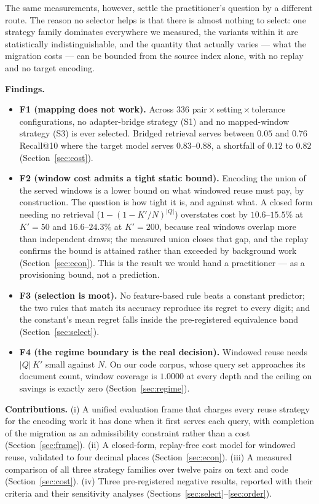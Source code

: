 \documentclass[conference]{IEEEtran}
\begin{document}
The same measurements, however, settle the practitioner's question by a different
route. The reason no selector helps is that there is almost nothing to select: one
strategy family dominates everywhere we measured, the variants within it are
statistically indistinguishable, and the quantity that actually varies --- what the
migration costs --- can be bounded from the source index alone, with no replay and no target
encoding.

\textbf{Findings.}
\begin{itemize}
\item \textbf{F1 (mapping does not work).} Across 336
pair\,$\times$\,setting\,$\times$\,tolerance configurations, no adapter-bridge strategy
(S1) and no mapped-window strategy (S3) is ever selected. Bridged retrieval serves
between $0.05$ and $0.76$ Recall@10 where the target model serves $0.83$--$0.88$, a
shortfall of $0.12$ to $0.82$ (Section~\ref{sec:cost}).
\item \textbf{F2 (window cost admits a tight static bound).} Encoding the union of the
served windows is a lower bound on what windowed reuse must pay, by construction. The
question is how tight it is, and against what. A closed form needing no retrieval
($1 - (1 - K'/N)^{|Q|}$) overstates cost by $10.6$--$15.5\%$ at $K' = 50$ and
$16.6$--$24.3\%$ at $K' = 200$, because real windows overlap more than independent draws;
the measured union closes that gap, and the replay confirms the bound is attained rather
than exceeded by background work (Section~\ref{sec:econ}). This is the result we would hand
a practitioner --- as a provisioning bound, not a prediction.
\item \textbf{F3 (selection is moot).} No feature-based rule beats a constant
predictor; the two rules that match its accuracy reproduce its regret to every digit;
and the constant's mean regret falls inside the pre-registered equivalence band
(Section~\ref{sec:select}).
\item \textbf{F4 (the regime boundary is the real decision).} Windowed reuse needs
$|Q|\,K'$ small against $N$. On our code corpus, whose query set approaches its
document count, window coverage is $1.0000$ at every depth and the ceiling on savings
is exactly zero (Section~\ref{sec:regime}).
\end{itemize}

\textbf{Contributions.} (i) A unified evaluation frame that charges every reuse
strategy for the encoding work it has done when it first serves each query, with
completion of the migration as an admissibility constraint rather than a cost
(Section~\ref{sec:frame}). (ii) A closed-form, replay-free cost model for windowed
reuse, validated to four decimal places (Section~\ref{sec:econ}). (iii) A measured
comparison of all three strategy families over twelve pairs on text and code
(Section~\ref{sec:cost}). (iv) Three pre-registered negative results, reported with
their criteria and their sensitivity analyses (Sections~\ref{sec:select}--\ref{sec:order}).
\end{document}
